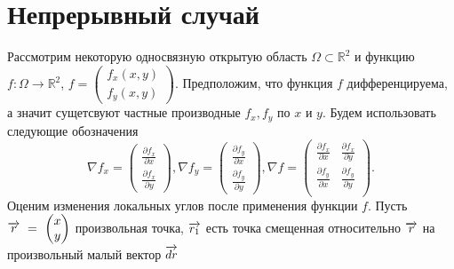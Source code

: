 \section{Непрерывный случай}
\label{sec:continious}

Рассмотрим некоторую односвязную открытую область $\Omega \subset \mathbb{R}^2$ и функцию 
$f: \Omega \to \mathbb{R}^2$, $f = \begin{pmatrix} f_x(x, y) \\ f_y(x, y) \end{pmatrix}$. 
Предположим, что функция $f$ дифференцируема, а значит сущетсвуют частные производные $f_x, f_y$ по $x$ и $y$. 
Будем использовать следующие обозначения
$$
  \nabla f_x = \begin{pmatrix} \frac{\partial f_x}{\partial x} \\ \frac{\partial f_x}{\partial y} \end{pmatrix}, 
  \nabla f_y = \begin{pmatrix} \frac{\partial f_y}{\partial x} \\ \frac{\partial f_y}{\partial y} \end{pmatrix}, 
  \nabla f = \begin{pmatrix} 
    \frac{\partial f_x}{\partial x} & \frac{\partial f_x}{\partial y} \\
    \frac{\partial f_y}{\partial x} & \frac{\partial f_y}{\partial y} \\
  \end{pmatrix}. 
$$
Оценим изменения локальных углов после применения функции $f$.
Пусть $\overrightarrow{r}~=~\begin{pmatrix} x \\ y \end{pmatrix}$ произвольная точка, 
$\overrightarrow{r_1}$ есть точка смещенная относительно $\overrightarrow{r}$ на произвольный малый вектор $\overrightarrow{dr}$ 

